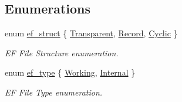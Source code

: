 \subsection*{Enumerations}
\begin{DoxyCompactItemize}
\item 
enum \hyperlink{group__fs_gae0b7a8fdbb83d5bdeaf6ee5bab8054fe}{ef\-\_\-struct} \{ \hyperlink{group__fs_ggae0b7a8fdbb83d5bdeaf6ee5bab8054feac719d3f34968bcf992d4c0c48841cf63}{Transparent}, 
\hyperlink{group__fs_ggae0b7a8fdbb83d5bdeaf6ee5bab8054feae0da40ac190d835380202f40a9fc76eb}{Record}, 
\hyperlink{group__fs_ggae0b7a8fdbb83d5bdeaf6ee5bab8054fea5aa1e27646a18fb490c0ff4a9b7b2f6e}{Cyclic}
 \}
\begin{DoxyCompactList}\small\item\em E\-F File Structure enumeration. \end{DoxyCompactList}\item 
enum \hyperlink{group__fs_ga6f46d6e4f39750fecff1240810793832}{ef\-\_\-type} \{ \hyperlink{group__fs_gga6f46d6e4f39750fecff1240810793832a7352fd1878874b86d44e973e7b7c046e}{Working}, 
\hyperlink{group__fs_gga6f46d6e4f39750fecff1240810793832aa992d66faf4c155dfd78ec168fc25f8a}{Internal}
 \}
\begin{DoxyCompactList}\small\item\em E\-F File Type enumeration. \end{DoxyCompactList}\end{DoxyCompactItemize}
